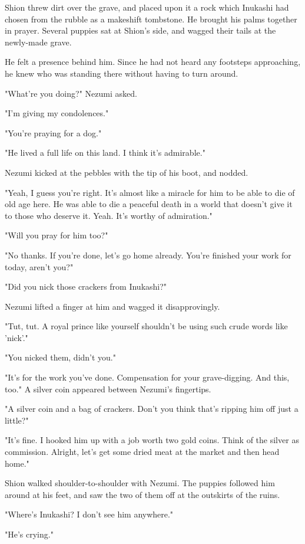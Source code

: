 Shion threw dirt over the grave, and placed upon it a rock which
Inukashi had chosen from the rubble as a makeshift tombstone. He brought
his palms together in prayer. Several puppies sat at Shion's side, and
wagged their tails at the newly-made grave.

He felt a presence behind him. Since he had not heard any footsteps
approaching, he knew who was standing there without having to turn
around.

"What're you doing?" Nezumi asked.

"I'm giving my condolences."

"You're praying for a dog."

"He lived a full life on this land. I think it's admirable."

Nezumi kicked at the pebbles with the tip of his boot, and nodded.

"Yeah, I guess you're right. It's almost like a miracle for him to be
able to die of old age here. He was able to die a peaceful death in a
world that doesn't give it to those who deserve it. Yeah. It's worthy of
admiration."

"Will you pray for him too?"

"No thanks. If you're done, let's go home already. You're finished your
work for today, aren't you?"

"Did you nick those crackers from Inukashi?"

Nezumi lifted a finger at him and wagged it disapprovingly.

"Tut, tut. A royal prince like yourself shouldn't be using such crude
words like 'nick'."

"You nicked them, didn't you."

"It's for the work you've done. Compensation for your grave-digging. And
this, too." A silver coin appeared between Nezumi's fingertips.

"A silver coin and a bag of crackers. Don't you think that's ripping him
off just a little?"

"It's fine. I hooked him up with a job worth two gold coins. Think of
the silver as commission. Alright, let's get some dried meat at the
market and then head home."

Shion walked shoulder-to-shoulder with Nezumi. The puppies followed him
around at his feet, and saw the two of them off at the outskirts of the
ruins.

"Where's Inukashi? I don't see him anywhere."

"He's crying."

